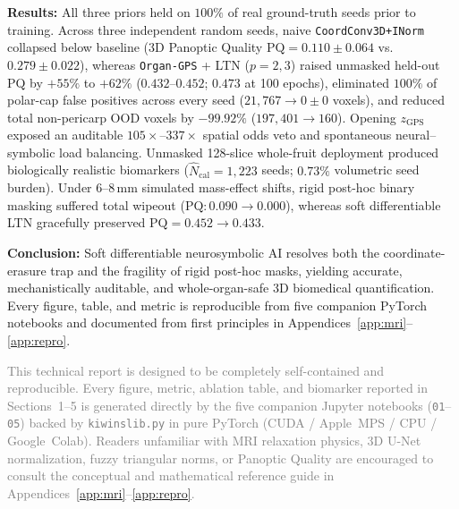 \documentclass[10pt,a4paper]{article}
\renewcommand{\_}{\origunderscore\allowbreak}
\begin{document}
\begin{keybox}
\textbf{Results:} All three priors held on $100\%$ of real ground-truth seeds prior to training. Across three independent random seeds, naive \texttt{CoordConv3D+INorm} collapsed below baseline (3D Panoptic Quality $\text{PQ} = 0.110 \pm 0.064$ vs.\ $0.279 \pm 0.022$), whereas \texttt{Organ-GPS} + LTN ($p=2,3$) raised unmasked held-out $\text{PQ}$ by $+55\%$ to $+62\%$ ($0.432\text{--}0.452$; $0.473$ at 100 epochs), eliminated $100\%$ of polar-cap false positives across every seed ($21{,}767 \to 0 \pm 0$ voxels), and reduced total non-pericarp OOD voxels by $-99.92\%$ ($197{,}401 \to 160$). Opening $z_{\text{GPS}}$ exposed an auditable $105\times$--$337\times$ spatial odds veto and spontaneous neural--symbolic load balancing. Unmasked 128-slice whole-fruit deployment produced biologically realistic biomarkers ($\hat{N}_{\text{cal}} = 1{,}223$ seeds; $0.73\%$ volumetric seed burden). Under $6\text{--}8\,\text{mm}$ simulated mass-effect shifts, rigid post-hoc binary masking suffered total wipeout ($\text{PQ}: 0.090 \to 0.000$), whereas soft differentiable LTN gracefully preserved $\text{PQ} = 0.452 \to 0.433$.

\textbf{Conclusion:} Soft differentiable neurosymbolic AI resolves both the coordinate-erasure trap and the fragility of rigid post-hoc masks, yielding accurate, mechanistically auditable, and whole-organ-safe 3D biomedical quantification. Every figure, table, and metric is reproducible from five companion PyTorch notebooks and documented from first principles in Appendices~\ref{app:mri}--\ref{app:repro}.
\end{keybox}

\vfill
\begin{center}
\footnotesize\textcolor{gray}{
This technical report is designed to be completely self-contained and reproducible. Every figure, metric, ablation table, and biomarker reported in Sections~1--5 is generated directly by the five companion Jupyter notebooks (\texttt{01}--\texttt{05}) backed by \texttt{kiwi\_ns\_lib.py} in pure PyTorch (CUDA / Apple~MPS / CPU / Google~Colab). Readers unfamiliar with MRI relaxation physics, 3D U-Net normalization, fuzzy triangular norms, or Panoptic Quality are encouraged to consult the conceptual and mathematical reference guide in Appendices~\ref{app:mri}--\ref{app:repro}.
}
\end{center}

\clearpage
\tableofcontents
\vspace{0.8cm}
\listoffigures
\vspace{0.6cm}
\listoftables
\end{document}

